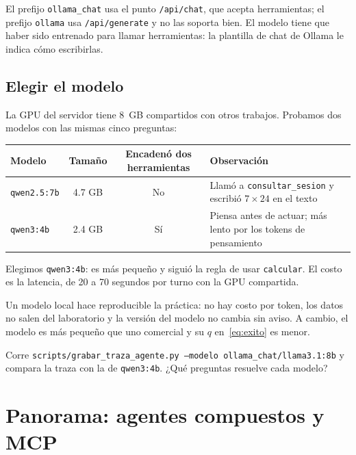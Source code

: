 \documentclass[11pt,letterpaper,oneside]{report}
\begin{document}
El prefijo \texttt{ollama\_chat} usa el punto \texttt{/api/chat}, que acepta herramientas; el prefijo \texttt{ollama} usa \texttt{/api/generate} y no las soporta bien. El modelo tiene que haber sido entrenado para llamar herramientas: la plantilla de chat de Ollama le indica cómo escribirlas.

\subsection{Elegir el modelo}

La GPU del servidor tiene 8~GB compartidos con otros trabajos. Probamos dos modelos con las mismas cinco preguntas:

\begin{center}\small
\begin{tabularx}{\textwidth}{@{}lccX@{}}
\toprule
Modelo & Tamaño & Encadenó dos herramientas & Observación \\
\midrule
\texttt{qwen2.5:7b} & 4.7 GB & No & Llamó a \texttt{consultar\_sesion} y escribió $7\times 24$ en el texto \\
\texttt{qwen3:4b}   & 2.4 GB & Sí & Piensa antes de actuar; más lento por los tokens de pensamiento \\
\bottomrule
\end{tabularx}
\end{center}

Elegimos \texttt{qwen3:4b}: es más pequeño y siguió la regla de usar \texttt{calcular}. El costo es la latencia, de 20 a 70 segundos por turno con la GPU compartida.

\begin{nota}[Reproducibilidad]
Un modelo local hace reproducible la práctica: no hay costo por token, los datos no salen del laboratorio y la versión del modelo no cambia sin aviso. A cambio, el modelo es más pequeño que uno comercial y su $q$ en~\eqref{eq:exito} es menor.
\end{nota}

\begin{ejercicio}
Corre \texttt{scripts/grabar\_traza\_agente.py --modelo ollama\_chat/llama3.1:8b} y compara la traza con la de \texttt{qwen3:4b}. ¿Qué preguntas resuelve cada modelo?
\end{ejercicio}

\section{Panorama: agentes compuestos y MCP}
\end{document}
